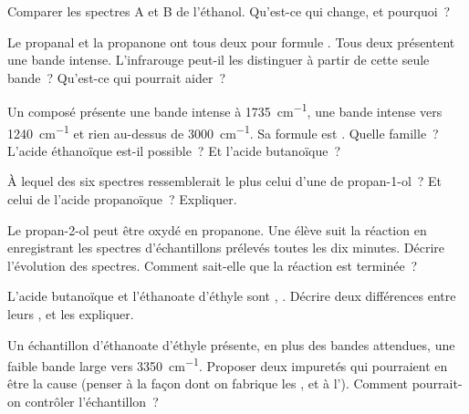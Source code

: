 \begin{exercise}[$\star\star$]\label{exo:g11:infrared:8}
Comparer les spectres A et B de l'éthanol. Qu'est-ce qui change, et
pourquoi~?
\end{exercise}

\begin{exercise}[$\star\star$]\label{exo:g11:infrared:9}
Le propanal et la propanone ont tous deux pour formule . Tous
deux présentent une bande  intense. L'infrarouge peut-il les
distinguer à partir de cette seule bande~? Qu'est-ce qui pourrait
aider~?
\end{exercise}

\begin{exercise}[$\star\star$]\label{exo:g11:infrared:10}
Un composé présente une bande intense à \qty{1735}{cm^{-1}}, une bande
intense vers \qty{1240}{cm^{-1}} et rien au-dessus de
\qty{3000}{cm^{-1}}. Sa formule est . Quelle famille~?
L'acide éthanoïque est-il possible~? Et l'acide butanoïque~?
\end{exercise}

\begin{exercise}[$\star\star$]\label{exo:g11:infrared:11}
À lequel des six spectres ressemblerait le plus celui d'une  de
propan-1-ol~? Et celui de l'acide propanoïque~? Expliquer.
\end{exercise}

\begin{exercise}[$\star\star\star$]\label{exo:g11:infrared:12}
Le propan-2-ol peut être oxydé en propanone. Une élève suit la réaction
en enregistrant les spectres d'échantillons prélevés toutes les dix
minutes. Décrire l'évolution des spectres. Comment sait-elle que la
réaction est terminée~?
\end{exercise}

\begin{exercise}[$\star\star\star$]\label{exo:g11:infrared:13}
L'acide butanoïque et l'éthanoate d'éthyle sont , .
Décrire deux différences entre leurs , et les
expliquer.
\end{exercise}

\begin{exercise}[$\star\star\star$]\label{exo:g11:infrared:14}
Un échantillon d'éthanoate d'éthyle présente, en plus des bandes
attendues, une faible bande large vers \qty{3350}{cm^{-1}}. Proposer deux
impuretés qui pourraient en être la cause (penser à la façon dont on
fabrique les , et à l'). Comment pourrait-on contrôler
l'échantillon~?
\end{exercise}

